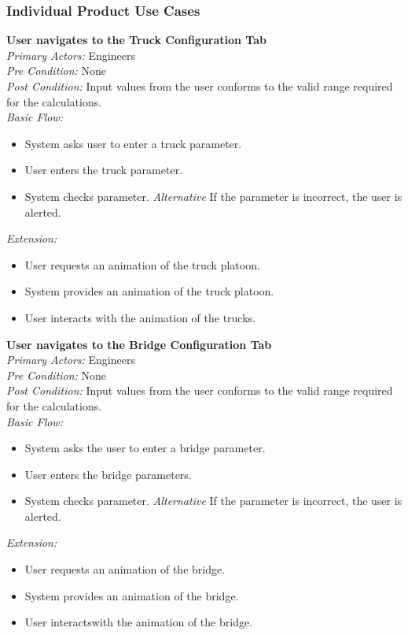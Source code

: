 \documentclass[12pt]{article}
\begin{document}
\subsubsection{Individual Product Use Cases}


\noindent
\textbf{User navigates to the Truck Configuration Tab} \\
\emph{  Primary Actors:} Engineers\\
\emph{  Pre Condition:} None\\
\emph{  Post Condition:} Input values from the user conforms to the valid range required for the calculations.\\ 
\emph{  Basic Flow:} 
\begin{itemize}
\item System asks user to enter a truck parameter.
\item User enters the truck parameter.
\item System checks parameter.
\subitem \emph{Alternative} If the parameter is incorrect, the user is alerted.
\end{itemize}
\emph{  Extension:}
\begin{itemize}
\item User requests an animation of the truck platoon.
\item System provides an animation of the truck platoon.
\item User interacts with the animation of the trucks. 
\end{itemize}

\noindent
\textbf{User navigates to the Bridge Configuration Tab} \\
\emph{  Primary Actors:} Engineers\\
\emph{  Pre Condition:} None\\
\emph{  Post Condition:} Input values from the user conforms to the valid range required for the calculations.\\ 
\emph{  Basic Flow:} 
\begin{itemize}
\item System asks the user to enter a bridge parameter. 
\item User enters the bridge parameters. 
\item System checks parameter.
\subitem \emph{Alternative} If the parameter is incorrect, the user is alerted.
\end{itemize}
\emph{  Extension:}
\begin{itemize}
\item User requests an animation of the bridge. 
\item System provides an animation of the bridge.
\item User interactswith the animation of the bridge.
\end{itemize}
\end{document}
